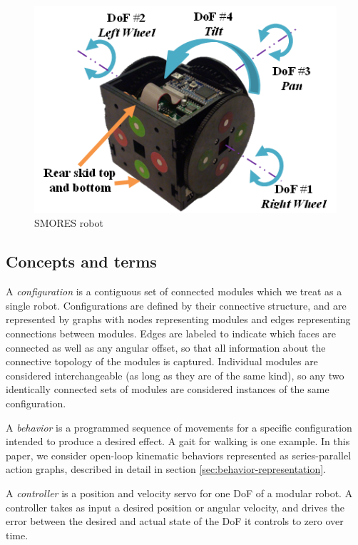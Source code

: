 \documentclass[conference]{IEEEtran}
\theoremstyle{definition}
\begin{document}
\begin{figure}[tb]
    \begin{center}
        \includegraphics[width=\columnwidth]{images/smores_robot.png}
    \end{center}
    \caption{SMORES robot}
    \label{fig:SmoresRobot}
\end{figure}

\subsection{Concepts and terms}
A \textit{configuration} is a contiguous set of connected modules which we treat as a
single robot.  Configurations are defined by their connective structure, and
are represented by graphs with nodes representing modules and edges
representing connections between modules.  Edges are labeled to indicate which
faces are connected as well as any angular offset, so that all information
about the connective topology of the modules is captured.  Individual modules
are considered interchangeable (as long as they are of the same kind), so any
two identically connected sets of modules are considered instances of the same
configuration.

A \textit{behavior} is a programmed sequence of movements for a specific configuration
intended to produce a desired effect.  A gait for walking is one example.  In
this paper, we consider open-loop kinematic behaviors represented as
series-parallel action graphs, described in detail in section
\ref{sec:behavior-representation}.

A \textit{controller} is a position and velocity servo for one DoF of a modular
robot.  A controller takes as input a desired position or angular velocity, and
drives the error between the desired and actual state of the DoF it controls to
zero over time.
\end{document}
